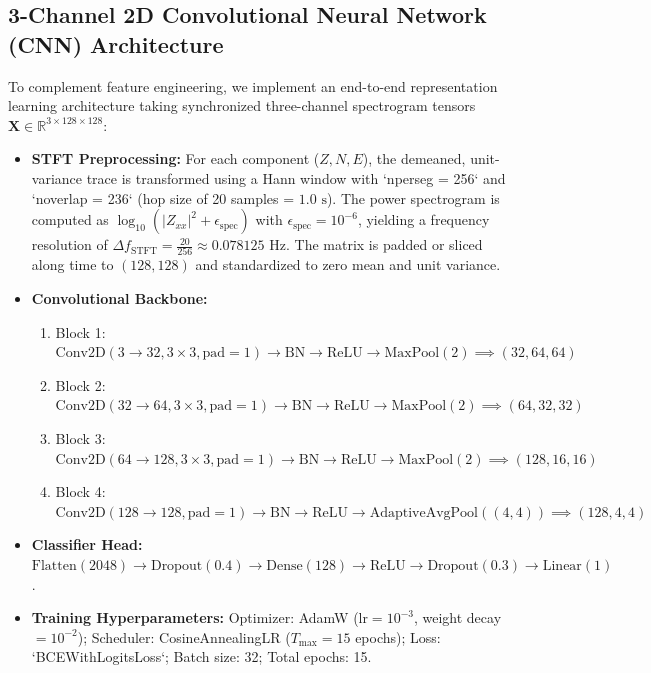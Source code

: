 \documentclass[11pt,a4paper]{article}
\begin{document}
\subsection{3-Channel 2D Convolutional Neural Network (CNN) Architecture}
To complement feature engineering, we implement an end-to-end representation learning architecture taking synchronized three-channel spectrogram tensors $\mathbf{X} \in \mathbb{R}^{3 \times 128 \times 128}$:
\begin{itemize}
    \item \textbf{STFT Preprocessing:} For each component ($Z, N, E$), the demeaned, unit-variance trace is transformed using a Hann window with `nperseg = 256` and `noverlap = 236` (hop size of 20 samples = $1.0\text{ s}$). The power spectrogram is computed as $\log_{10}(|Z_{xx}|^2 + \epsilon_{\text{spec}})$ with $\epsilon_{\text{spec}} = 10^{-6}$, yielding a frequency resolution of $\Delta f_{\text{STFT}} = \frac{20}{256} \approx 0.078125\text{ Hz}$. The matrix is padded or sliced along time to $(128, 128)$ and standardized to zero mean and unit variance.
    \item \textbf{Convolutional Backbone:}
    \begin{enumerate}
        \item Block 1: $\text{Conv2D}(3 \to 32, 3\times3, \text{pad}=1) \to \text{BN} \to \text{ReLU} \to \text{MaxPool}(2) \implies (32, 64, 64)$
        \item Block 2: $\text{Conv2D}(32 \to 64, 3\times3, \text{pad}=1) \to \text{BN} \to \text{ReLU} \to \text{MaxPool}(2) \implies (64, 32, 32)$
        \item Block 3: $\text{Conv2D}(64 \to 128, 3\times3, \text{pad}=1) \to \text{BN} \to \text{ReLU} \to \text{MaxPool}(2) \implies (128, 16, 16)$
        \item Block 4: $\text{Conv2D}(128 \to 128, \text{pad}=1) \to \text{BN} \to \text{ReLU} \to \text{AdaptiveAvgPool}((4, 4)) \implies (128, 4, 4)$
    \end{enumerate}
    \item \textbf{Classifier Head:} $\text{Flatten}(2048) \to \text{Dropout}(0.4) \to \text{Dense}(128) \to \text{ReLU} \to \text{Dropout}(0.3) \to \text{Linear}(1)$.
    \item \textbf{Training Hyperparameters:} Optimizer: AdamW ($\text{lr} = 10^{-3}$, weight decay $= 10^{-2}$); Scheduler: CosineAnnealingLR ($T_{\max} = 15$ epochs); Loss: `BCEWithLogitsLoss`; Batch size: 32; Total epochs: 15.
\end{itemize}
\end{document}
